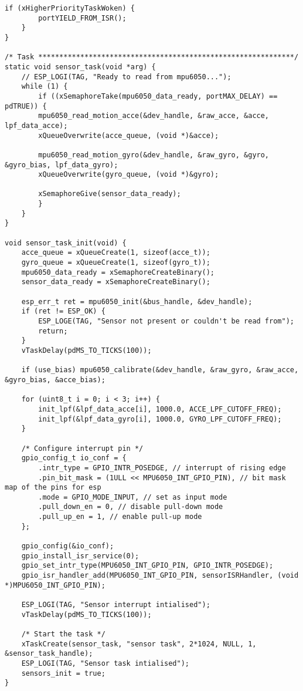 \begin{lstlisting}[caption={Register Read}]
    if (xHigherPriorityTaskWoken) {
        portYIELD_FROM_ISR();
    }
}

/* Task *************************************************************/
static void sensor_task(void *arg) {
    // ESP_LOGI(TAG, "Ready to read from mpu6050...");
    while (1) {
        if ((xSemaphoreTake(mpu6050_data_ready, portMAX_DELAY) == pdTRUE)) {
        mpu6050_read_motion_acce(&dev_handle, &raw_acce, &acce, lpf_data_acce);
        xQueueOverwrite(acce_queue, (void *)&acce);

        mpu6050_read_motion_gyro(&dev_handle, &raw_gyro, &gyro, &gyro_bias, lpf_data_gyro);
        xQueueOverwrite(gyro_queue, (void *)&gyro);

        xSemaphoreGive(sensor_data_ready); 
        }
    }
}

void sensor_task_init(void) {
    acce_queue = xQueueCreate(1, sizeof(acce_t));
    gyro_queue = xQueueCreate(1, sizeof(gyro_t));
    mpu6050_data_ready = xSemaphoreCreateBinary();
    sensor_data_ready = xSemaphoreCreateBinary();

    esp_err_t ret = mpu6050_init(&bus_handle, &dev_handle);
    if (ret != ESP_OK) {
        ESP_LOGE(TAG, "Sensor not present or couldn't be read from");
        return;
    }
    vTaskDelay(pdMS_TO_TICKS(100)); 

    if (use_bias) mpu6050_calibrate(&dev_handle, &raw_gyro, &raw_acce, &gyro_bias, &acce_bias);

    for (uint8_t i = 0; i < 3; i++) {
        init_lpf(&lpf_data_acce[i], 1000.0, ACCE_LPF_CUTOFF_FREQ);
        init_lpf(&lpf_data_gyro[i], 1000.0, GYRO_LPF_CUTOFF_FREQ);
    }

    /* Configure interrupt pin */
    gpio_config_t io_conf = {
        .intr_type = GPIO_INTR_POSEDGE, // interrupt of rising edge
        .pin_bit_mask = (1ULL << MPU6050_INT_GPIO_PIN), // bit mask map of the pins for esp
        .mode = GPIO_MODE_INPUT, // set as input mode
        .pull_down_en = 0, // disable pull-down mode
        .pull_up_en = 1, // enable pull-up mode
    };
    
    gpio_config(&io_conf);
    gpio_install_isr_service(0);
    gpio_set_intr_type(MPU6050_INT_GPIO_PIN, GPIO_INTR_POSEDGE);
    gpio_isr_handler_add(MPU6050_INT_GPIO_PIN, sensorISRHandler, (void *)MPU6050_INT_GPIO_PIN);

    ESP_LOGI(TAG, "Sensor interrupt intialised");
    vTaskDelay(pdMS_TO_TICKS(100)); 

    /* Start the task */
    xTaskCreate(sensor_task, "sensor task", 2*1024, NULL, 1, &sensor_task_handle);
    ESP_LOGI(TAG, "Sensor task intialised");
    sensors_init = true; 
}


\end{lstlisting}
